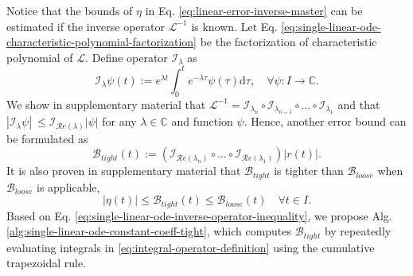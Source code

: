 \documentclass{uai2023}
\newcommand{\Err}{\eta}
\newcommand{\Bound}{\mathcal{B}}
\renewcommand{\L}{\mathcal{L}}
\newcommand{\I}{\mathcal{I}}
\renewcommand{\Re}[1]{\mathcal{R}e\left(#1\right)}
\begin{document}
    Notice that the bounds of $\Err$ in Eq. \ref{eq:linear-error-inverse-master} can be estimated if the inverse operator $\L^{-1}$ is known. 
    Let Eq. \ref{eq:single-linear-ode-characteristic-polynomial-factorization} be the factorization of characteristic polynomial of $\L$.
    Define operator $\I_{\lambda}$ as
    \begin{equation} \label{eq:integral-operator-definition}
        \I_\lambda \psi(t) := e^{{\lambda} t} \int_{0}^{t} e^{-{\lambda} \tau} \psi(\tau) \mathrm{d}\tau, \quad \forall \psi : I \to \mathbb{C}.
    \end{equation}
    We show in supplementary material that $\L^{-1} = \I_{\lambda_{n}} \circ \I_{\lambda_{n-1}} \circ \dots \circ \I_{\lambda_1}$ and that $\left|\I_{\lambda} \psi\right| \ \leq \I_{\Re{\lambda}} |\psi|$ for any $\lambda \in \mathbb{C}$ and function $\psi$.
    Hence, another error bound can be formulated as
    \begin{equation} \label{eq:single-linear-ode-inverse-operator-inequality}
        \Bound_{tight}(t) := \left(\I_{\Re{\lambda_{n}}} \circ \dots \circ \I_{\Re{\lambda_1}}\right) |r(t)|.
    \end{equation}
    It is also proven in supplementary material that $\Bound_{tight}$ is tighter than $\Bound_{loose}$ when $\Bound_{loose}$ is applicable,
    \begin{equation} \label{eq:single-linear-ode-tight-and-loose}
        \left|\Err(t)\right| \leq \Bound_{tight}(t) \leq \Bound_{loose}(t) \quad \forall t \in I.
    \end{equation}
    Based on Eq. \ref{eq:single-linear-ode-inverse-operator-inequality}, we propose Alg. \ref{alg:single-linear-ode-constant-coeff-tight}, which computes $\Bound_{tight}$ by repeatedly evaluating integrals in \ref{eq:integral-operator-definition} using the cumulative trapezoidal rule.
\end{document}
